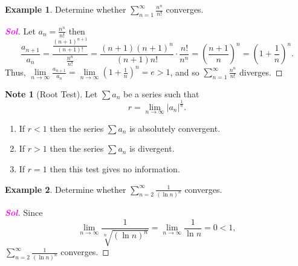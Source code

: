 \documentclass[12pt,openany]{book}
\theoremstyle{definition}
\newtheorem*{note}{Note}
\newtheorem{example}{Example}[section]
\newcommand{\of}[1]{\left( #1 \right)}
\newcommand{\abs}[1]{\left\lvert #1 \right\rvert}
\newcommand{\sol}{\textcolor{magenta}{\bf Sol}}
\begin{document}
	\vspace{4pt}
	\begin{example}
		Determine whether $\sum_{n=1}^\infty\frac{n^n}{n!}$ converges.
		\begin{proof}[\sol]
			Let $a_n=\frac{n^n}{n!}$ then \[
			\frac{a_{n+1}}{a_n}=\frac{\frac{\of{n+1}^{n+1}}{\of{n+1}!}}{\frac{n^n}{n!}}=\frac{(n+1)(n+1)^n}{(n+1)n!}\cdot\frac{n!}{n^n}=\of{\frac{n+1}{n}}^n=\of{1+\frac{1}{n}}^n.
			\] Thus, $\lim\limits_{n\to\infty}\frac{a_{n+1}}{a_n}=\lim\limits_{n\to\infty}\of{1+\frac{1}{n}}^n=e>1$, and so $\sum_{n=1}^\infty\frac{n^n}{n!}$ diverges.
		\end{proof}
	\end{example}
	\vspace{8pt}
	\begin{note}[Root Test]
		Let $\sum a_n$ be a series such that \[
		r=\lim\limits_{n\to\infty}\abs{a_n}^{\frac{1}{n}}.
		\]\begin{enumerate}
			\item If $r<1$ then the series $\sum a_n$ is absolutely convergent.
			\item If $r>1$ then the series $\sum a_n$ is divergent.
			\item If $r=1$ then this test gives no information.
		\end{enumerate}
	\end{note}
	\vspace{4pt}
	\begin{example}
		Determine whether $\sum_{n=2}^\infty\frac{1}{\of{\ln n}^n}$ converges.
		\begin{proof}[\sol]
			Since \[
			\lim\limits_{n\to\infty}\frac{1}{\sqrt[n]{\of{\ln n}^n}}=\lim\limits_{n\to\infty}\frac{1}{\ln n}=0<1,
			\] $\sum_{n=2}^\infty\frac{1}{\of{\ln n}^n}$ converges.
		\end{proof}
	\end{example}
\end{document}
